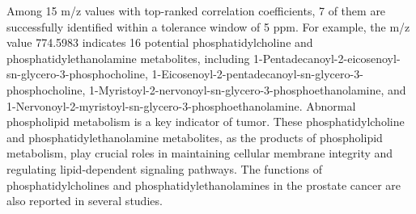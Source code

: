 \documentclass[journal=jacsat,manuscript=article]{achemso}
\begin{document}
Among 15 m/z values with top-ranked correlation coefficients, 
7 of them are successfully identified within a tolerance window of 5 ppm. 
For example, the m/z value 774.5983 
indicates 16 potential phosphatidylcholine 
and phosphatidylethanolamine metabolites, including 
1-Pentadecanoyl-2-eicosenoyl-sn-glycero-3-phosphocholine, 
1-Eicosenoyl-2-pentadecanoyl-sn-glycero-3-phosphocholine, 
1-Myristoyl-2-nervonoyl-sn-glycero-3-phosphoethanolamine,  
and 1-Nervonoyl-2-myristoyl-sn-glycero-3-phosphoethanolamine. 
Abnormal phospholipid metabolism is a key indicator of tumor. 
These phosphatidylcholine and 
phosphatidylethanolamine metabolites, as the products of phospholipid metabolism, 
play crucial roles in maintaining cellular 
membrane integrity and regulating lipid-dependent signaling pathways. 
The functions of phosphatidylcholines and phosphatidylethanolamines in the 
prostate cancer are also reported in several studies.
\end{document}
